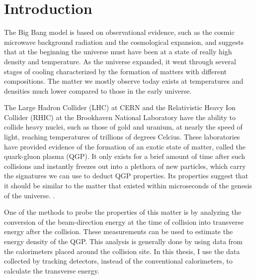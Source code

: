 \chapter{Introduction} \label{ch:introduction}

The Big Bang model is based on observational evidence, such as the cosmic microwave background radiation and the cosmological expansion, and suggests that at the beginning the universe must have been at a state of really high density and temperature. As the universe expanded, it went through several stages of cooling characterized by the formation of matters with different compositions. The matter we mostly observe today exists at temperatures and densities much lower compared to those in the early universe.

The Large Hadron Collider (LHC) at CERN and the Relativistic Heavy Ion Collider (RHIC) at the Brookhaven National Laboratory have the ability to collide heavy nuclei, such as those of gold and uranium, at nearly the speed of light, reaching temperatures of trillions of degrees Celcius. These laboratories have provided evidence of the formation of an exotic state of matter, called the quark-gluon plasma (QGP). It only exists for a brief amount of time after such collisions and instantly freezes out into a plethora of new particles, which carry the signatures we can use to deduct QGP properties. Its properties suggest that it should be similar to the matter that existed within microseconds of the genesis of the universe.%
\cite{RHIC white paper}.

One of the methods to probe the properties of this matter is by analyzing the conversion of the beam-direction energy at the time of collision into transverse energy after the collision. These measurements can be used to estimate the energy density of the QGP. This analysis is generally done by using data from the calorimeters placed around the collision site. In this thesis, I use the data collected by tracking detectors, instead of the conventional calorimeters, to calculate the transverse energy.

